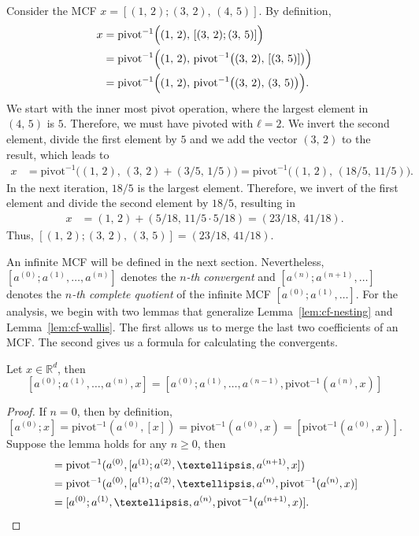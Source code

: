 \begin{example}
  Consider the MCF $x = [(1,\, 2); (3,\, 2),\, (4,\, 5)]$.
  By definition,
  \begin{align*}
    x & = \mathrm{pivot}^{-1}\Bigl((1,\, 2),\, [(3,\, 2); (3,\, 5)]\Bigr) \\
      & = \mathrm{pivot}^{-1}\Bigl((1,\, 2),\, \mathrm{pivot}^{-1}\bigl((3,\, 2),\, [(3,\, 5)]\bigr)\Bigr) \\
      & = \mathrm{pivot}^{-1}\Bigl((1,\, 2),\, \mathrm{pivot}^{-1}\bigl((3,\, 2),\, (3,\, 5)\bigr)\Bigr).
  \end{align*}
  We start with the inner most pivot operation,
  where the largest element in $(4,\, 5)$ is $5$.
  Therefore, we must have pivoted with $ℓ = 2$.
  We invert the second element, divide the first element by $5$
  and we add the vector $(3,\, 2)$ to the result, which leads to
  \begin{align*}
    x & = \mathrm{pivot}^{-1}\bigl((1,\, 2),\, (3,\, 2) + (3/5,\, 1/5)\bigr)
        = \mathrm{pivot}^{-1}\bigl((1,\, 2),\, (18/5,\, 11/5)\bigr).
  \end{align*}
  In the next iteration, $18/5$ is the largest element.
  Therefore, we invert of the first element and divide the second element by $18/5$,
  resulting in
  \begin{align*}
    x & = (1,\, 2) + (5/18,\, 11/5 · 5/18) = (23/18,\, 41/18).
  \end{align*}
  Thus, $[(1,\, 2); (3,\, 2),\, (3,\, 5)] = (23/18,\, 41/18)$.
\end{example}

An infinite MCF will be defined in the next section.
Nevertheless, $[a^{(0)}; a^{(1)}, …, a^{(n)}]$ denotes the \emph{$n$-th convergent}
and $[a^{(n)}; a^{(n+1)}, …]$ denotes the \emph{$n$-th complete quotient} of the infinite MCF $[a^{(0)}; a^{(1)}, …]$.
For the analysis,
we begin with two lemmas that generalize Lemma~\ref{lem:cf-nesting} and Lemma~\vref{lem:cf-wallis}.
The first allows us to merge the last two coefficients of an MCF.
The second gives us a formula for calculating the convergents.

\begin{lemma}
  \label{lem:mcf-nesting}
  Let $x ∈ ℝ^d$, then
  \[
    [a^{(0)}; a^{(1)}, …, a^{(n)}, x]
    = [a^{(0)}; a^{(1)}, …, a^{(n-1)}, \mathrm{pivot}^{-1}(a^{(n)}, x)]
  \]
\end{lemma}

\begin{proof}
  If $n = 0$, then by definition,
  \[
    [a^{(0)}; x] = \mathrm{pivot}^{-1}(a^{(0)}, [x]) = \mathrm{pivot}^{-1}(a^{(0)}, x) = [\mathrm{pivot}^{-1}(a^{(0)}, x)].
  \]
  Suppose the lemma holds for any $n ≥ 0$, then
  \begin{align*}
    [a^{(0)}; a^{(1)}, …, a^{(n+1)}, x]
    & = \mathrm{pivot}^{-1}(a^{(0)}, [a^{(1)}; a^{(2)}, …, a^{(n+1)}, x]) \\
    & = \mathrm{pivot}^{-1}(a^{(0)}, [a^{(1)}; a^{(2)}, …, a^{(n)}, \mathrm{pivot}^{-1}(a^{(n)}, x)] \\
    & = [a^{(0)}; a^{(1)}, …, a^{(n)}, \mathrm{pivot}^{-1}(a^{(n+1)}, x)]. \qedhere
  \end{align*}
\end{proof}

